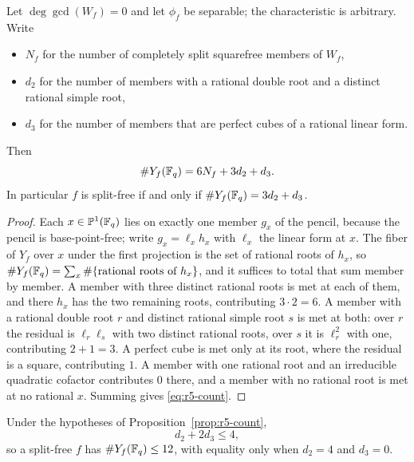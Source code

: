 \begin{proposition}\label{prop:r5-count}%
%
%
Let $\deg\gcd(W_f)=0$ and let $\phi_f$ be separable; the characteristic
is arbitrary.
Write
\begin{itemize}
\item $N_f$ for the number of completely split squarefree members of
      $W_f$,
\item $d_2$ for the number of members with a rational double root and a
      distinct rational simple root,
\item $d_3$ for the number of members that are perfect cubes of a
      rational linear form.
\end{itemize}
Then
\begin{equation}\label{eq:r5-count}
       \#Y_f(\mathbb F_q)=6N_f+3d_2+d_3 .
\end{equation}
In particular $f$ is split-free if and only if
$\#Y_f(\mathbb F_q)=3d_2+d_3$.
\end{proposition}

\begin{proof}
Each $x\in\mathbb P^1(\mathbb F_q)$ lies on exactly one member $g_x$ of the pencil,
because the pencil is base-point-free; write $g_x=\ell_xh_x$ with
$\ell_x$ the linear form at $x$.  The fiber of $Y_f$ over $x$ under the
first projection is the set of rational roots of $h_x$, so
$\#Y_f(\mathbb F_q)=\sum_x\#\{\text{rational roots of }h_x\}$, and it suffices
to total that sum member by member.  A member with three distinct
rational roots is met at each of them, and there $h_x$ has the two
remaining roots, contributing $3\cdot2=6$.  A member with a rational
double root $r$ and distinct rational simple root $s$ is met at both:
over $r$ the residual is $\ell_r\ell_s$ with two distinct rational
roots, over $s$ it is $\ell_r^2$ with one, contributing $2+1=3$.  A
perfect cube is met only at its root, where the residual is a square,
contributing $1$.  A member with one rational root and an irreducible
quadratic cofactor contributes $0$ there, and a member with no rational
root is met at no rational $x$.  Summing gives \eqref{eq:r5-count}.
\end{proof}

\begin{lemma}\label{lem:r5-branch}%
%
%
Under the hypotheses of Proposition~\ref{prop:r5-count},
\[
       d_2+2d_3\leq4,
\]
so a split-free $f$ has $\#Y_f(\mathbb F_q)\leq12$, with equality only when
$d_2=4$ and $d_3=0$.
\end{lemma}

